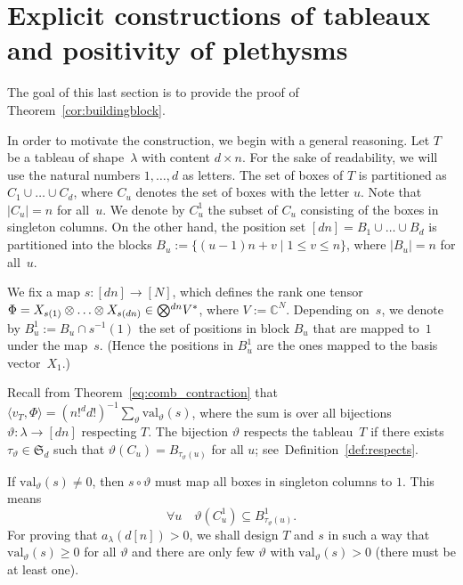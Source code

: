 \documentclass[11pt]{amsart}
\def\C{\mathbb{C}}
\def\la{\lambda}
\newcommand{\out}{d}
\newcommand{\inn}{n}
\newcommand{\IC}{\ensuremath{\mathbb{C}}}
\newcommand{\aS}{\ensuremath{\mathfrak{S}}}
\newcommand{\tensor}{\smash{\textstyle\bigotimes}}
\newcommand{\val}{\mathrm{val}}
\numberwithin{equation}{section}
\begin{document}
\section{Explicit constructions of tableaux and positivity of plethysms}%
\label{sec:tableaux}

The goal of this last section is to provide the proof of Theorem~\ref{cor:buildingblock}. 

In order to motivate the construction, we begin with a general reasoning.
Let $T$ be a tableau of shape~$\la$ with content $\out\times\inn$.  
For the sake of readability, we will use the natural numbers $1,\ldots,d$ as letters.
The set of boxes of $T$ is partitioned as 
$C_1 \cup\ldots \cup C_d$,
where $C_u$ denotes the set of boxes with the letter $u$. 
Note that $|C_u| = n$ for all~$u$. 
We denote by $C^1_u$ the subset of $C_u$ consisting of the boxes in singleton columns. 
On the other hand, the position set $[dn] = B_1 \cup\ldots \cup B_d$ is partitioned into the blocks
$B_u := \{ (u-1)n+ v \mid  1 \le v \le n \}$, where $|B_u| = n$ for all~$u$. 

We fix a map $s\colon [dn] \to [N]$, which defines the rank one tensor 
$\Phi=X_{s(1)}\otimes\ldots\otimes X_{s(dn)} \in \tensor^{dn} V^*$,
where $V:=\C^N$. %
Depending on~$s$, we denote by 
$B^1_u := B_u \cap s^{-1}(1)$ the set of positions in block $B_u$ 
that are mapped to~$1$ under the map~$s$. 
(Hence the positions in $B^1_u$ are the ones mapped to the basis vector~$X_1$.)

Recall from Theorem~\ref{eq:comb_contraction} that 
$\langle v_T,\Phi\rangle = (n!^d d!)^{-1} \sum_{\vartheta} \val_\vartheta (s)$, 
where the sum is over all bijections $\vartheta\colon\la\to [dn]$ respecting $T$.
The bijection $\vartheta$ respects the tableau~$T$ if 
there exists $\tau_\vartheta\in\aS_d$ such that 
$\vartheta(C_u) = B_{\tau_\vartheta(u)}$ for all $u$;
see\ Definition~\ref{def:respects}. 

If $\val_\vartheta(s) \ne 0$, then $s \circ \vartheta$ must map all boxes 
in singleton columns to $1$.  
This means
\begin{equation}\label{eq:key-ST}
 \forall u\quad \vartheta(C^1_u) \subseteq B^1_{\tau_\vartheta(u)} .
\end{equation}
For proving that $a_{\la}(\out[\inn]) >0$, we shall design 
$T$ and $s$ in such a way that 
$\val_\vartheta(s) \ge 0$ for all $\vartheta$ and 
there are only few $\vartheta$ with $\val_\vartheta(s) > 0$
(there must be at least one). 
\end{document}
